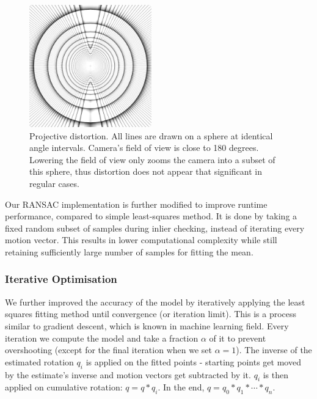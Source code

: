 \documentclass[11pt,english]{report}
\begin{document}
\begin{figure}[!ht]
	\centering
	\includegraphics[width=150pt]{docs/report/distortion.jpg}
	\caption{\centering Projective distortion. All lines are drawn on a sphere at identical angle intervals. Camera's field of view is close to 180 degrees. Lowering the field of view only zooms the camera into a subset of this sphere, thus distortion does not appear that significant in regular cases.}
\end{figure}

Our RANSAC implementation is further modified to improve runtime performance, compared to simple least-squares method. It is done by taking a fixed random subset of samples during inlier checking, instead of iterating every motion vector. This results in lower computational complexity while still retaining sufficiently large number of samples for fitting the mean.

\subsubsection{Iterative Optimisation}

We further improved the accuracy of the model by iteratively applying the least squares fitting method until convergence (or iteration limit). This is a process similar to gradient descent, which is known in machine learning field. Every iteration we compute the model and take a fraction $\alpha$ of it to prevent overshooting (except for the final iteration when we set $\alpha = 1$). The inverse of the estimated rotation $q_i$ is applied on the fitted points - starting points get moved by the estimate's inverse and motion vectors get subtracted by it. $q_i$ is then applied on cumulative rotation: $q = q * q_i$. In the end, $q = q_0 * q_1 * \cdots * q_n$.
\end{document}
